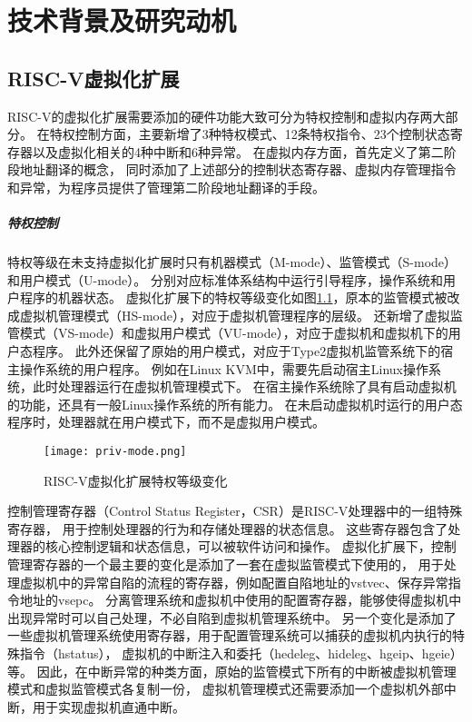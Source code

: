 \chapter{技术背景及研究动机}

\section{RISC-V虚拟化扩展}
RISC-V的虚拟化扩展需要添加的硬件功能大致可分为特权控制和虚拟内存两大部分。
在特权控制方面，主要新增了3种特权模式、12条特权指令、23个控制状态寄存器以及虚拟化相关的4种中断和6种异常。
在虚拟内存方面，首先定义了第二阶段地址翻译的概念，
同时添加了上述部分的控制状态寄存器、虚拟内存管理指令和异常，为程序员提供了管理第二阶段地址翻译的手段。

\paragraph{特权控制}
特权等级在未支持虚拟化扩展时只有机器模式（M-mode）、监管模式（S-mode）和用户模式（U-mode）。
分别对应标准体系结构中运行引导程序，操作系统和用户程序的机器状态。
虚拟化扩展下的特权等级变化如图\ref*{fig:priv-mode}，原本的监管模式被改成虚拟机管理模式（HS-mode），对应于虚拟机管理程序的层级。
还新增了虚拟监管模式（VS-mode）和虚拟用户模式（VU-mode），对应于虚拟机和虚拟机下的用户态程序。
此外还保留了原始的用户模式，对应于Type2虚拟机监管系统下的宿主操作系统的用户程序。
例如在Linux KVM中，需要先启动宿主Linux操作系统，此时处理器运行在虚拟机管理模式下。
在宿主操作系统除了具有启动虚拟机的功能，还具有一般Linux操作系统的所有能力。
在未启动虚拟机时运行的用户态程序时，处理器就在用户模式下，而不是虚拟用户模式。

\begin{figure}[htbp]
    \centering
    \texttt{[image: priv-mode.png]}
    \caption{RISC-V虚拟化扩展特权等级变化}
    \label{fig:priv-mode}
\end{figure}

控制管理寄存器（Control Status Register，CSR）是RISC-V处理器中的一组特殊寄存器，
用于控制处理器的行为和存储处理器的状态信息。
这些寄存器包含了处理器的核心控制逻辑和状态信息，可以被软件访问和操作。
虚拟化扩展下，控制管理寄存器的一个最主要的变化是添加了一套在虚拟监管模式下使用的，
用于处理虚拟机中的异常自陷的流程的寄存器，例如配置自陷地址的vstvec、保存异常指令地址的vsepc。
分离管理系统和虚拟机中使用的配置寄存器，能够使得虚拟机中出现异常时可以自己处理，不必自陷到虚拟机管理系统中。
另一个变化是添加了一些虚拟机管理系统使用寄存器，用于配置管理系统可以捕获的虚拟机内执行的特殊指令（hstatus），
虚拟机的中断注入和委托（hedeleg、hideleg、hgeip、hgeie）等。 因此，在中断异常的种类方面，原始的监管模式下所有的中断被虚拟机管理模式和虚拟监管模式各复制一份，
虚拟机管理模式还需要添加一个虚拟机外部中断，用于实现虚拟机直通中断。


